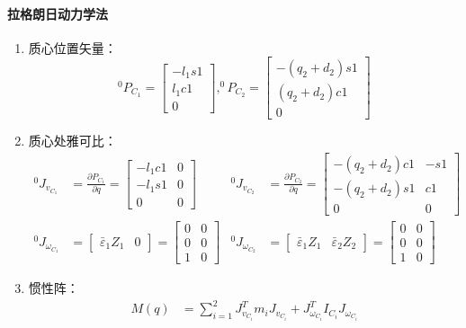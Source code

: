 \documentclass[
12pt, %
a4paper, 
oneside, %
headinclude,footinclude, %
]{scrartcl}
\begin{document}
{\paragraph{拉格朗日动力学法}
\begin{enumerate}
\item 质心位置矢量：
$$ ^0 P_{C_1} = \begin{bmatrix} -l_1 s1 \\ l_1 c1 \\ 0 \end{bmatrix}, ^0 P_{C_2} = \begin{bmatrix} -(q_2 + d_2)s1 \\ (q_2 + d_2)c1 \\ 0 \end{bmatrix} $$
\item 质心处雅可比：
\begin{align*}
^0J_{v_{C_1}} &= \frac{\partial P_{C_1}}{\partial q} = \begin{bmatrix} -l_1 c1 & 0 \\ -l_1 s1 & 0 \\ 0 & 0 \end{bmatrix} & ^0J_{v_{C_2}} &= \frac{\partial P_{C_2}}{\partial q} = \begin{bmatrix} -(q_2 + d_2)c1 & -s1 \\ -(q_2 + d_2)s1 & c1 \\ 0 & 0 \end{bmatrix} \\
^0J_{\omega_{C_1}} &= \begin{bmatrix} \bar{\varepsilon}_1 Z_1 & 0 \end{bmatrix} = \begin{bmatrix} 0 & 0 \\ 0 & 0 \\ 1 & 0 \end{bmatrix} & ^0J_{\omega_{C_2}} &= \begin{bmatrix} \bar{\varepsilon}_1 Z_1 & \bar{\varepsilon}_2 Z_2 \end{bmatrix} = \begin{bmatrix} 0 & 0 \\ 0 & 0 \\ 1 & 0 \end{bmatrix}
\end{align*}
\item 惯性阵：
\begin{align*}
M(q) &= \sum_{i = 1}^{2} J_{v_{C_i}}^T m_i J_{v_{C_i}} + J_{\omega_{C_i}}^T I_{C_i} J_{\omega_{C_i}} \\

\end{align*}
\end{enumerate}}
\end{document}
